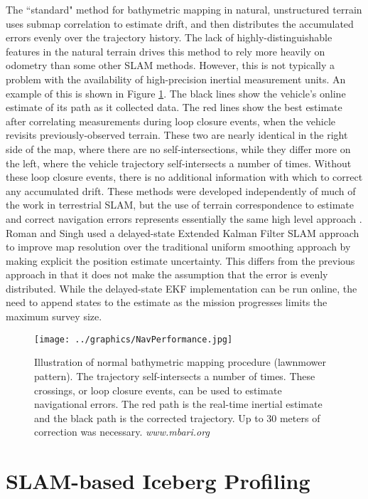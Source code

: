 The ``standard" method for bathymetric mapping in natural, unstructured terrain uses submap correlation to estimate drift, and then distributes the accumulated errors evenly over the trajectory history. The lack of highly-distinguishable features in the natural terrain drives this method to rely more heavily on odometry than some other SLAM methods. However, this is not typically a problem with the availability of high-precision inertial measurement units. An example of this is shown in Figure \ref{fig:BathyMapping}. The black lines show the vehicle's online estimate of its path as it collected data. The red lines show the best estimate after correlating measurements during loop closure events, when the vehicle revisits previously-observed terrain. These two are nearly identical in the right side of the map, where there are no self-intersections, while they differ more on the left, where the vehicle trajectory self-intersects a number of times. Without these loop closure events, there is no additional information with which to correct any accumulated drift. These methods were developed independently of much of the work in terrestrial SLAM, but the use of terrain correspondence to estimate and correct navigation errors represents essentially the same high level approach \cite{Henthorn2006}.  Roman and Singh used a delayed-state Extended Kalman Filter SLAM approach to improve map resolution over the traditional uniform smoothing approach by making explicit the position estimate uncertainty\cite{Roman2005}. This differs from the previous approach in that it does not make the assumption that the error is evenly distributed. While the delayed-state EKF implementation can be run online, the need to append states to the estimate as the mission progresses limits the maximum survey size.

 \begin{figure}[!htb]
   \centering
   \texttt{[image: ../graphics/NavPerformance.jpg]} %
   \caption{Illustration of normal bathymetric mapping procedure (lawnmower pattern). The trajectory self-intersects a number of times. These crossings, or loop closure events, can be used to estimate navigational errors. The red path is the real-time inertial estimate and the black path is the corrected trajectory. Up to 30 meters of correction was necessary. \emph{www.mbari.org} }
   \label{fig:BathyMapping}
\end{figure}


\section{SLAM-based Iceberg Profiling}

